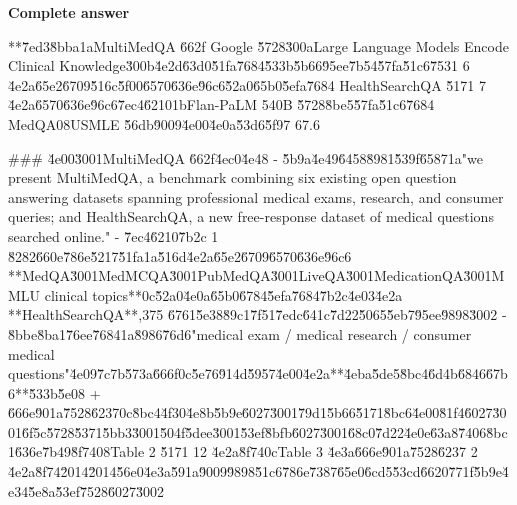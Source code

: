\documentclass[10pt]{article}
\begin{document}
\textbf{Complete answer}
\begin{AnswerText}
**\u7ed3\u8bba\uff1aMultiMedQA \u662f Google \u5728\u300aLarge Language Models Encode Clinical Knowledge\u300b\u4e2d\u63d0\u51fa\u7684\u533b\u5b66\u95ee\u7b54\u57fa\u51c6\u7531 6 \u4e2a\u65e2\u6709\u516c\u5f00\u6570\u636e\u96c6\u52a0\u65b0\u5efa\u7684 HealthSearchQA \u5171 7 \u4e2a\u6570\u636e\u96c6\u7ec4\u6210\uff1bFlan-PaLM 540B \u5728\u8be5\u57fa\u51c6\u7684 MedQA\uff08USMLE \u56db\u9009\u4e00\u4e0a\u53d6\u5f97 67.6%

### \u4e00\u3001MultiMedQA \u662f\u4ec0\u4e48
- \u5b9a\u4e49\u6458\u8981\u539f\u6587\uff1a"we present MultiMedQA, a benchmark combining six existing open question answering datasets spanning professional medical exams, research, and consumer queries; and HealthSearchQA, a new free-response dataset of medical questions searched online."
- \u7ec4\u6210\u7b2c 1 \u8282\u660e\u786e\u5217\u51fa\uff1a\u516d\u4e2a\u65e2\u6709\u6570\u636e\u96c6 **MedQA\u3001MedMCQA\u3001PubMedQA\u3001LiveQA\u3001MedicationQA\u3001MMLU clinical topics**\uff0c\u52a0\u4e0a\u65b0\u6784\u5efa\u7684\u7b2c\u4e03\u4e2a **HealthSearchQA**,375 \u6761\u5e38\u89c1\u7f51\u7edc\u641c\u7d22\u5065\u5eb7\u95ee\u9898\u3002
- \u8bbe\u8ba1\u76ee\u7684\uff1a\u8986\u76d6"medical exam / medical research / consumer medical questions"\u4e09\u7c7b\u573a\u666f\uff0c\u5e76\u914d\u5957\u4e00\u4e2a**\u4eba\u5de5\u8bc4\u6d4b\u6846\u67b6**\u533b\u5e08 + \u666e\u901a\u7528\u6237\uff0c\u8bc4\u4f30\u4e8b\u5b9e\u6027\u3001\u79d1\u5b66\u5171\u8bc6\u4e00\u81f4\u6027\u3001\u6f5c\u5728\u5371\u5bb3\u3001\u504f\u5dee\u3001\u53ef\u8bfb\u6027\u3001\u68c0\u7d22\u4e0e\u63a8\u7406\u8bc1\u636e\u7b49\u8f74\uff08Table 2 \u5171 12 \u4e2a\u8f74\uff0cTable 3 \u4e3a\u666e\u901a\u7528\u6237 2 \u4e2a\u8f74\u2014\u2014\u56e0\u4e3a\u591a\u9009\u9898\u51c6\u786e\u7387\u65e0\u6cd5\u53cd\u6620\u771f\u5b9e\u4e34\u5e8a\u53ef\u7528\u6027\u3002


\end{AnswerText}
\end{document}
